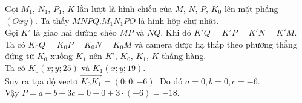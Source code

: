 \begin{bt}
{		Gọi $M_1$, $N_1$, $P_1$,  $K$ lần lượt là hình chiếu của $M$, $N$, $P$, $K_0$ lên mặt phẳng $(Oxy)$.
		Ta thấy $MNPQ.M_1N_1PO$ là  hình hộp chữ nhật.\\
		Gọi $K'$ là giao hai đường chéo $MP$ và $NQ$. Khi đó $K'Q=K'P=K'N=K'M$.\\ Ta có  $K_0Q=K_0P=K_0N=K_0M$ và camera được hạ thấp theo phương thẳng đứng từ $K_0$ xuống $K_1$ nên $K'$, $K_0$, $K_1$, $K$ thẳng hàng.\\
		Ta có $K_0(x;y;25)$ và  $K_1(x;y;19)$.\\
		Suy ra tọa độ vectơ $\overrightarrow{K_0K_1} =(0;0;-6).$  Do đó $a=0, b=0, c=-6.$\\
		Vậy $P =  a+b+3c = 0+0+3 \cdot (-6) = -18.$
	 }
\end{bt}



